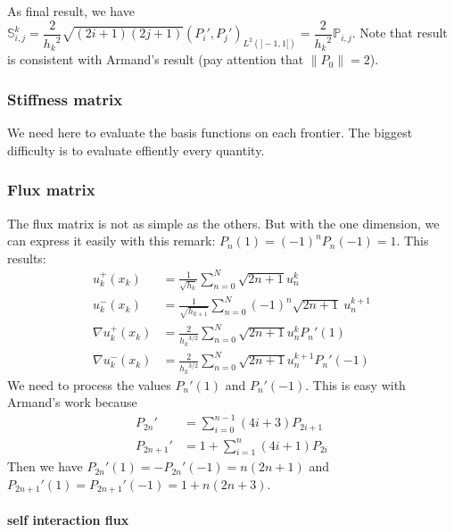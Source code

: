 \documentclass[a4paper,10pt,draft]{article}
\begin{document}
As final result, we have $\mathbb{S}_{i,j}^k = \dfrac{2}{{h_k}^2} \sqrt{(2i+1)(2j+1)} \left( P_i' , 
P_j' \right)_{L^2(]-1,1[)} = \dfrac{2}{{h_k}^2} \mathbb{P}_{i,j}$. Note that result is consistent 
with Armand's result (pay attention that $\|P_0\| = 2$).

\subsubsection{Stiffness matrix}

We need here to evaluate the basis functions on each frontier. The biggest difficulty is to 
evaluate effiently every quantity.

\iffalse 

\subsubsection{Flux matrix}

The flux matrix is not as simple as the others. But with the one dimension, we can express it 
easily with this remark: $P_n(1) = (-1)^n P_n(-1) = 1$. This results:
\begin{align*}
 u^+_k(x_k) &= \frac{1}{\sqrt{h_k}} \sum_{n=0}^N \sqrt{2n+1} u_n^k\\
 u^-_k(x_k) &= \frac{1}{\sqrt{h_{k+1}}} \sum_{n=0}^N (-1)^n \sqrt{2n+1}\ u_n^{k+1}\\
 \nabla u_k^+ (x_k) &= \frac{2}{{h_k}^{3/2}} \sum_{n=0}^N \sqrt{2n+1} u_n^k P_n'(1) \\
 \nabla u_k^- (x_k) &= \frac{2}{{h_k}^{3/2}} \sum_{n=0}^N \sqrt{2n+1} u_n^{k+1} P_n'(-1)
\end{align*}
We need to process the values $P_n'(1)$ and $P_n'(-1)$. This is easy with Armand's work because
\begin{align*}
 P_{2n}' &= \sum_{i=0}^{n-1} (4i+3) P_{2i+1} \\
 P_{2n+1}' &= 1 + \sum_{i=1}^{n} (4i+1) P_{2i}
\end{align*}
Then we have $P_{2n}'(1) = -P_{2n}'(-1) = n(2n+1)$ and $P_{2n+1}'(1) = P_{2n+1}'(-1) = 1 + n(2n+3)$.

\paragraph{self interaction flux}
\end{document}
